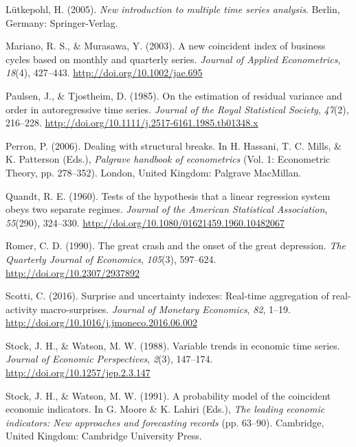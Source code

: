 \documentclass[12pt,twoside]{reedthesis}
\begin{document}
\leavevmode\hypertarget{ref-lutkepohl:2005}{}%
Lütkepohl, H. (2005). \emph{New introduction to multiple time series analysis}. Berlin, Germany: Springer-Verlag.

\leavevmode\hypertarget{ref-marimura:2003}{}%
Mariano, R. S., \& Murasawa, Y. (2003). A new coincident index of business cycles based on monthly and quarterly series. \emph{Journal of Applied Econometrics}, \emph{18}(4), 427--443. \url{http://doi.org/10.1002/jae.695}

\leavevmode\hypertarget{ref-paultjos:1985}{}%
Paulsen, J., \& Tjostheim, D. (1985). On the estimation of residual variance and order in autoregressive time series. \emph{Journal of the Royal Statistical Society}, \emph{47}(2), 216--228. \url{http://doi.org/10.1111/j.2517-6161.1985.tb01348.x}

\leavevmode\hypertarget{ref-perron:2006}{}%
Perron, P. (2006). Dealing with structural breaks. In H. Hassani, T. C. Mills, \& K. Patterson (Eds.), \emph{Palgrave handbook of econometrics} (Vol. 1: Econometric Theory, pp. 278--352). London, United Kingdom: Palgrave MacMillan.

\leavevmode\hypertarget{ref-quandt:1960}{}%
Quandt, R. E. (1960). Tests of the hypothesis that a linear regression system obeys two separate regimes. \emph{Journal of the American Statistical Association}, \emph{55}(290), 324--330. \url{http://doi.org/10.1080/01621459.1960.10482067}

\leavevmode\hypertarget{ref-romer:1990}{}%
Romer, C. D. (1990). The great crash and the onset of the great depression. \emph{The Quarterly Journal of Economics}, \emph{105}(3), 597--624. \url{http://doi.org/10.2307/2937892}

\leavevmode\hypertarget{ref-scotti:2016}{}%
Scotti, C. (2016). Surprise and uncertainty indexes: Real-time aggregation of real-activity macro-surprises. \emph{Journal of Monetary Economics}, \emph{82}, 1--19. \url{http://doi.org/10.1016/j.jmoneco.2016.06.002}

\leavevmode\hypertarget{ref-stocwats:1988}{}%
Stock, J. H., \& Watson, M. W. (1988). Variable trends in economic time series. \emph{Journal of Economic Perspectives}, \emph{2}(3), 147--174. \url{http://doi.org/10.1257/jep.2.3.147}

\leavevmode\hypertarget{ref-stocwats:1991}{}%
Stock, J. H., \& Watson, M. W. (1991). A probability model of the coincident economic indicators. In G. Moore \& K. Lahiri (Eds.), \emph{The leading economic indicators: New approaches and forecasting records} (pp. 63--90). Cambridge, United Kingdom: Cambridge University Press.
\end{document}
